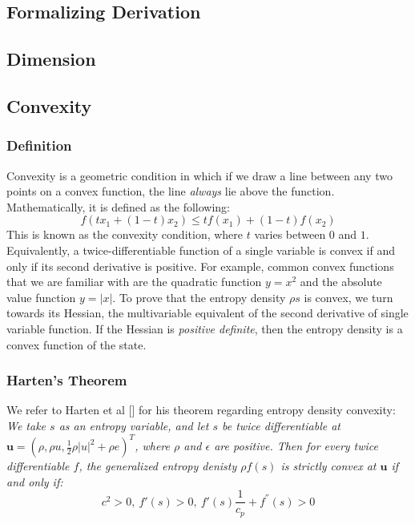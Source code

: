 \documentclass[a4paper]{article}
\numberwithin{equation}{section}
\begin{document}
\subsection{Formalizing Derivation}
\subsection{Dimension}
\subsection{Convexity}
\subsubsection{Definition}
Convexity is a geometric condition in which if we draw a line between any two points on a convex function, the line \textit{always} lie above the function. Mathematically, it is defined as the following:
\begin{equation}
    f(tx_1 + (1-t)x_2) \leq tf(x_1) + (1-t)f(x_2)
\end{equation}
This is known as the convexity condition, where $t$ varies between $0$ and $1$. Equivalently, a twice-differentiable function of a single variable is convex if and only if its second derivative is positive. For example, common convex functions that we are familiar with are the quadratic function $y = x^2$ and the absolute value function $y = \left| x \right|$.
To prove that the entropy density $\rho s$ is convex, we turn towards its Hessian, the multivariable equivalent of the second derivative of single variable function. If the Hessian is \textit{positive definite}, then the entropy density is a convex function of the state.

\subsubsection{Harten's Theorem}
We refer to Harten et al [] for his theorem regarding entropy density convexity:\textit{
We take $s$ as an entropy variable, and let $s$ be twice differentiable at $\mathbf{u} = (\rho, \rho u, \frac{1}{2}\rho \left|u \right|^2 + \rho e)^T$, where $\rho$ and $\epsilon$ are positive. Then for every twice differentiable $f$, the generalized entropy denisty $\rho f(s)$ is strictly convex at $\mathbf{u}$ if and only if:}
\begin{equation}
    c^2 > 0, \ f'(s) > 0,\  f'(s) \frac{1}{c_p} + f^{''} (s) > 0
\end{equation}
\end{document}
